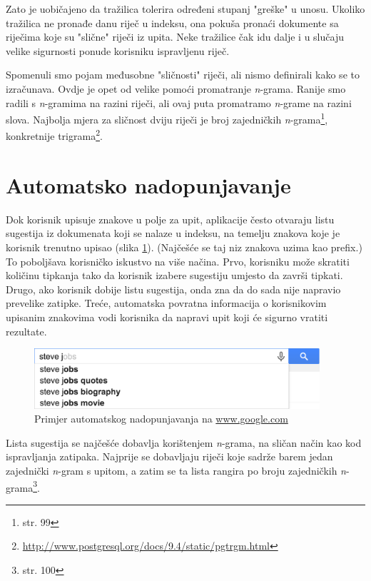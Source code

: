 \documentclass[a4paper,twoside,12pt]{memoir}
\begin{document}
Zato je uobičajeno da tražilica tolerira određeni stupanj "greške" u unosu. Ukoliko tražilica ne pronađe danu riječ u indeksu, ona pokuša pronaći dokumente sa riječima koje su "slične" riječi iz upita. Neke tražilice čak idu dalje i u slučaju velike sigurnosti ponude korisniku ispravljenu riječ.

Spomenuli smo pojam međusobne "sličnosti" riječi, ali nismo definirali kako se to izračunava. Ovdje je opet od velike pomoći promatranje \textit{n}-grama. Ranije smo radili s \textit{n}-gramima na razini riječi, ali ovaj puta promatramo \textit{n}-grame na razini slova. Najbolja mjera za sličnost dviju riječi je broj zajedničkih \textit{n}-grama\footnote{\cite{taming} str. 99}, konkretnije trigrama\footnote{\url{http://www.postgresql.org/docs/9.4/static/pgtrgm.html}}.

\section{Automatsko nadopunjavanje}

Dok korisnik upisuje znakove u polje za upit, aplikacije često otvaraju listu sugestija iz dokumenata koji se nalaze u indeksu, na temelju znakova koje je korisnik trenutno upisao (slika \ref{typeahead}). (Najčešće se taj niz znakova uzima kao prefix.) To poboljšava korisničko iskustvo na više načina. Prvo, korisniku može skratiti količinu tipkanja tako da korisnik izabere sugestiju umjesto da završi tipkati. Drugo, ako korisnik dobije listu sugestija, onda zna da do sada nije napravio prevelike zatipke. Treće, automatska povratna informacija o korisnikovim upisanim znakovima vodi korisnika da napravi upit koji će sigurno vratiti rezultate.

\begin{figure}[H]
  \centering
  \includegraphics[width=300pt]{typeahead}
  \caption{Primjer automatskog nadopunjavanja na \url{www.google.com}}
  \label{typeahead}
\end{figure}

Lista sugestija se najčešće dobavlja korištenjem \textit{n}-grama, na sličan način kao kod ispravljanja zatipaka. Najprije se dobavljaju riječi koje sadrže barem jedan zajednički \textit{n}-gram s upitom, a zatim se ta lista rangira po broju zajedničkih \textit{n}-grama\footnote{\cite{taming} str. 100}.
\end{document}
